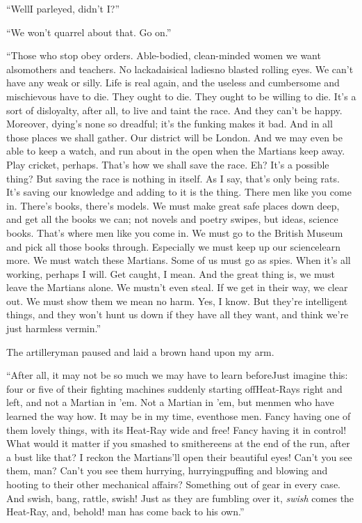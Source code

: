 ``Well\dash{}I parleyed, didn't I?''

``We won't quarrel about that. Go on.''

``Those who stop obey orders. Able-bodied, clean-minded women we
want also\dash{}mothers and teachers. No lackadaisical ladies\dash{}no
blasted rolling eyes. We can't have any weak or silly. Life is real
again, and the useless and cumbersome and mischievous have to die.
They ought to die. They ought to be willing to die. It's a sort of
disloyalty, after all, to live and taint the race. And they can't
be happy. Moreover, dying's none so dreadful; it's the funking
makes it bad. And in all those places we shall gather. Our district
will be London. And we may even be able to keep a watch, and run
about in the open when the Martians keep away. Play cricket,
perhaps. That's how we shall save the race. Eh? It's a possible
thing? But saving the race is nothing in itself. As I say, that's
only being rats. It's saving our knowledge and adding to it is the
thing. There men like you come in. There's books, there's models.
We must make great safe places down deep, and get all the books we
can; not novels and poetry swipes, but ideas, science books. That's
where men like you come in. We must go to the British Museum and
pick all those books through. Especially we must keep up our
science\dash{}learn more. We must watch these Martians. Some of us must
go as spies. When it's all working, perhaps I will. Get caught, I
mean. And the great thing is, we must leave the Martians alone. We
mustn't even steal. If we get in their way, we clear out. We must
show them we mean no harm. Yes, I know. But they're intelligent
things, and they won't hunt us down if they have all they want, and
think we're just harmless vermin.''

The artilleryman paused and laid a brown hand upon my arm.

``After all, it may not be so much we may have to learn before\dash{}Just
imagine this: four or five of their fighting machines suddenly
starting off\dash{}Heat-Rays right and left, and not a Martian in 'em.
Not a Martian in 'em, but men\dash{}men who have learned the way how. It
may be in my time, even\dash{}those men. Fancy having one of them lovely
things, with its Heat-Ray wide and free! Fancy having it in
control! What would it matter if you smashed to smithereens at the
end of the run, after a bust like that? I reckon the Martians'll
open their beautiful eyes! Can't you see them, man? Can't you see
them hurrying, hurrying\dash{}puffing and blowing and hooting to their
other mechanical affairs? Something out of gear in every case. And
swish, bang, rattle, swish! Just as they are fumbling over it,
\emph{swish} comes the Heat-Ray, and, behold! man has come back to
his own.''

